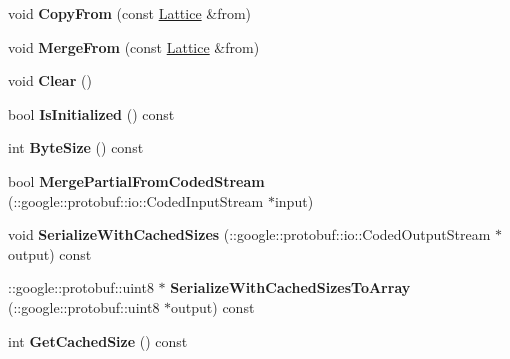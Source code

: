 \begin{DoxyCompactItemize}
\item 
\hypertarget{classlattice_1_1Lattice_a06293cf4a975500085cb11ff59418655}{
void {\bfseries CopyFrom} (const \hyperlink{classlattice_1_1Lattice}{Lattice} \&from)}
\label{classlattice_1_1Lattice_a06293cf4a975500085cb11ff59418655}

\item 
\hypertarget{classlattice_1_1Lattice_afcab65a875a55ec9f5ebc88f2b22a662}{
void {\bfseries MergeFrom} (const \hyperlink{classlattice_1_1Lattice}{Lattice} \&from)}
\label{classlattice_1_1Lattice_afcab65a875a55ec9f5ebc88f2b22a662}

\item 
\hypertarget{classlattice_1_1Lattice_a69643c6d759f3c59ca72f0b640e744cf}{
void {\bfseries Clear} ()}
\label{classlattice_1_1Lattice_a69643c6d759f3c59ca72f0b640e744cf}

\item 
\hypertarget{classlattice_1_1Lattice_a2a517e87a5ff555951149bd6c8f2fcc0}{
bool {\bfseries IsInitialized} () const }
\label{classlattice_1_1Lattice_a2a517e87a5ff555951149bd6c8f2fcc0}

\item 
\hypertarget{classlattice_1_1Lattice_aa1fa86cdd3f0897665f5a69c299ce120}{
int {\bfseries ByteSize} () const }
\label{classlattice_1_1Lattice_aa1fa86cdd3f0897665f5a69c299ce120}

\item 
\hypertarget{classlattice_1_1Lattice_a13776f9114d9135033c6a7ef0e5aa855}{
bool {\bfseries MergePartialFromCodedStream} (::google::protobuf::io::CodedInputStream $\ast$input)}
\label{classlattice_1_1Lattice_a13776f9114d9135033c6a7ef0e5aa855}

\item 
\hypertarget{classlattice_1_1Lattice_a211943e304584090a05bff477ba64bf3}{
void {\bfseries SerializeWithCachedSizes} (::google::protobuf::io::CodedOutputStream $\ast$output) const }
\label{classlattice_1_1Lattice_a211943e304584090a05bff477ba64bf3}

\item 
\hypertarget{classlattice_1_1Lattice_a679d526d9a589eb74f642d876fb5b339}{
::google::protobuf::uint8 $\ast$ {\bfseries SerializeWithCachedSizesToArray} (::google::protobuf::uint8 $\ast$output) const }
\label{classlattice_1_1Lattice_a679d526d9a589eb74f642d876fb5b339}

\item 
\hypertarget{classlattice_1_1Lattice_a93bab06ef91469b47be8794cacd5a5f7}{
int {\bfseries GetCachedSize} () const }
\label{classlattice_1_1Lattice_a93bab06ef91469b47be8794cacd5a5f7}


\end{DoxyCompactItemize}

